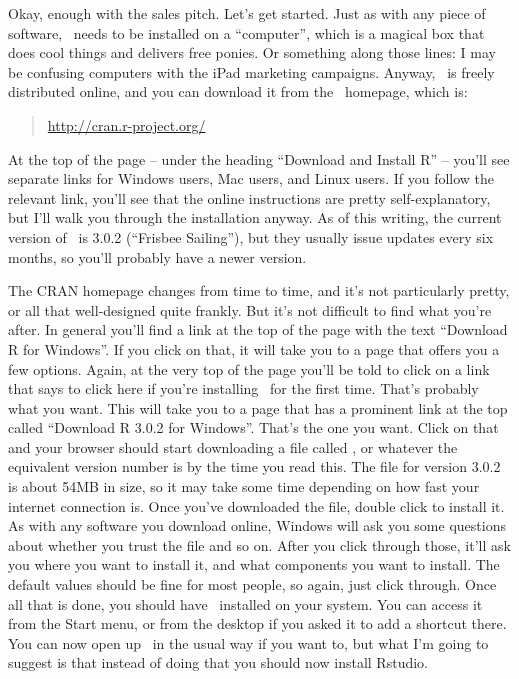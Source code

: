 Okay, enough with the sales pitch. Let's get started. Just as with any piece of software,  \R\  needs to be installed on a ``computer'', which is a magical box that does cool things and delivers free ponies. Or something along those lines: I may be confusing computers with the iPad marketing campaigns. Anyway, \R\  is freely distributed online, and you can download it from the  \R\  homepage, which is:
\begin{quote}
\url{http://cran.r-project.org/}
\end{quote}
At the top of the page -- under the heading ``Download and Install R'' -- you'll see separate links for Windows users, Mac users, and Linux users. If you follow the relevant link, you'll see that the online instructions are pretty self-explanatory, but I'll walk you through the installation anyway. As of this writing, the current version of  \R\  is 3.0.2 (``Frisbee Sailing''), but they usually issue updates every six months, so you'll probably have a newer version.


The CRAN homepage changes from time to time, and it's not particularly pretty, or all that well-designed quite frankly. But it's not difficult to find what you're after. In general you'll find a link at the top of the page with the text ``Download R for Windows''. If you click on that, it will take you to a page that offers you a few options. Again, at the very top of the page you'll be told to click on a link that says to click here if you're installing \R\ for the first time. That's probably what you want. This will take you to a page that has a prominent link at the top called ``Download R 3.0.2 for Windows''. That's the one you want. Click on that and your browser should start downloading a file called , or whatever the equivalent version number is by the time you read this. The file for version 3.0.2 is about 54MB in size, so it may take some time depending on how fast your internet connection is. Once you've downloaded the file, double click to install it. As with any software you download online, Windows will ask you some questions about whether you trust the file and so on. After you click through those, it'll ask you where you want to install it, and what components you want to install. The default values should be fine for most people, so again, just click through. Once all that is done, you should have  \R\  installed on your system. You can access it from the Start menu, or from the desktop if you asked it to add a shortcut there. You can now open up \R\ in the usual way if you want to, but what I'm going to suggest is that instead of doing that you should now install Rstudio.




